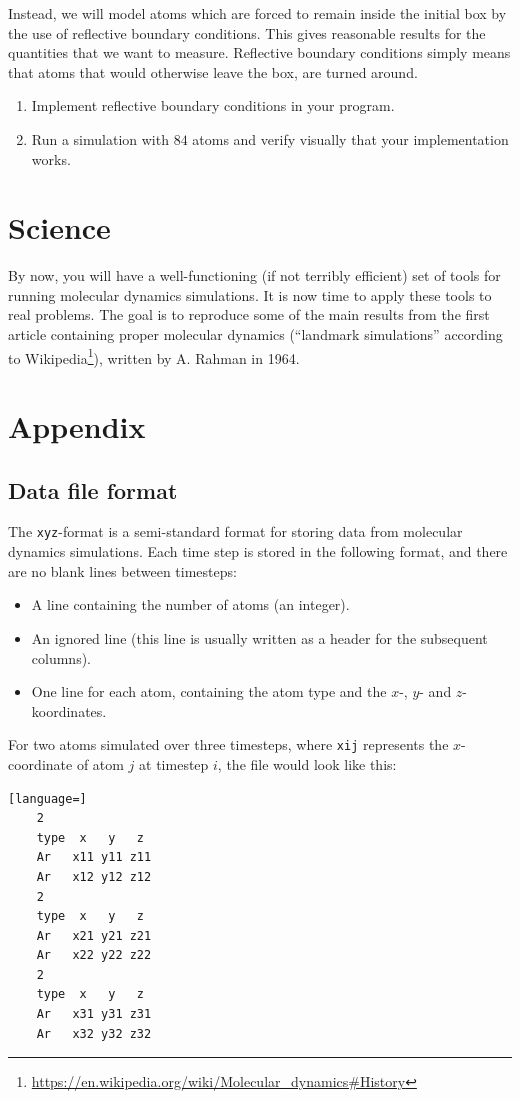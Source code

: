 \documentclass[11pt,british,a4paper]{report}
\renewcommand{\thesubsection}{\arabic{section}\alph{subsection})}
\begin{document}
Instead, we will model atoms which are forced to remain inside the initial box by the use of reflective boundary conditions. This gives reasonable results for the quantities that we want to measure.
Reflective boundary conditions simply means that atoms that would otherwise leave the box, are turned around.
\begin{enumerate}[label=\roman*.]
    \item Implement reflective boundary conditions in your program.
    \item Run a simulation with \(84\) atoms and verify visually that your implementation works.
\end{enumerate}

\section{Science}
By now, you will have a well-functioning (if not terribly efficient) set of tools for running molecular dynamics simulations. It is now time to apply these tools to real problems. The goal is to reproduce some of the main results from the first article containing proper molecular dynamics (``landmark simulations'' according to Wikipedia\footnote{\url{https://en.wikipedia.org/wiki/Molecular_dynamics\#History}}), written by A. Rahman in 1964\cite{Rahman_1964}.


\clearpage
\appendix
\section*{Appendix}
\setcounter{subsection}{0}
\renewcommand{\thesubsection}{\Alph{subsection}}

\subsection{Data file format}\label{app:xyz}
The \texttt{xyz}-format is a semi-standard format for storing data from molecular dynamics simulations. Each time step is stored in the following format, and there are no blank lines between timesteps:
\begin{itemize}
    \item A line containing the number of atoms (an integer).
    \item An ignored line (this line is usually written as a header for the subsequent columns).
    \item One line for each atom, containing the atom type and the \(x\)-, \(y\)- and \(z\)-koordinates.
\end{itemize}
For two atoms simulated over three timesteps, where \texttt{xij} represents the \(x\)-coordinate of atom \(j\) at timestep \(i\), the file would look like this:
\begin{lstlisting}[language=]
    2
    type  x   y   z
    Ar   x11 y11 z11
    Ar   x12 y12 z12
    2
    type  x   y   z
    Ar   x21 y21 z21
    Ar   x22 y22 z22
    2
    type  x   y   z
    Ar   x31 y31 z31
    Ar   x32 y32 z32
\end{lstlisting}
\end{document}
